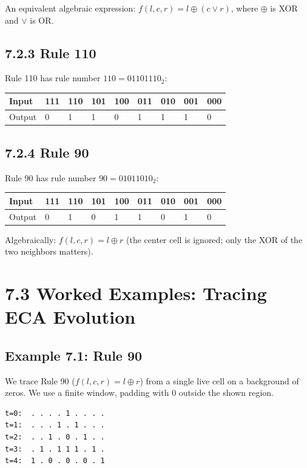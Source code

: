 An equivalent algebraic expression: $f(l, c, r) = l \oplus (c \lor r)$, where $\oplus$ is XOR and $\lor$ is OR.

\subsection{7.2.3 Rule 110}

Rule 110 has rule number $110 = 01101110_2$:

\begin{tabular}{|l|l|l|l|l|l|l|l|l|}
\hline
Input & 111 & 110 & 101 & 100 & 011 & 010 & 001 & 000 \\
\hline
Output & 0 & 1 & 1 & 0 & 1 & 1 & 1 & 0 \\
\hline
\end{tabular}


\subsection{7.2.4 Rule 90}

Rule 90 has rule number $90 = 01011010_2$:

\begin{tabular}{|l|l|l|l|l|l|l|l|l|}
\hline
Input & 111 & 110 & 101 & 100 & 011 & 010 & 001 & 000 \\
\hline
Output & 0 & 1 & 0 & 1 & 1 & 0 & 1 & 0 \\
\hline
\end{tabular}


Algebraically: $f(l, c, r) = l \oplus r$ (the center cell is ignored; only the XOR of the two neighbors matters).


\section{7.3 Worked Examples: Tracing ECA Evolution}

\subsection{Example 7.1: Rule 90}

We trace Rule 90 ($f(l,c,r) = l \oplus r$) from a single live cell on a background of zeros. We use a finite window, padding with 0 outside the shown region.

\begin{lstlisting}
t=0:  . . . . 1 . . . .
t=1:  . . . 1 . 1 . . .
t=2:  . . 1 . 0 . 1 . .
t=3:  . 1 . 1 1 1 . 1 .
t=4:  1 . 0 . 0 . 0 . 1
\end{lstlisting}

